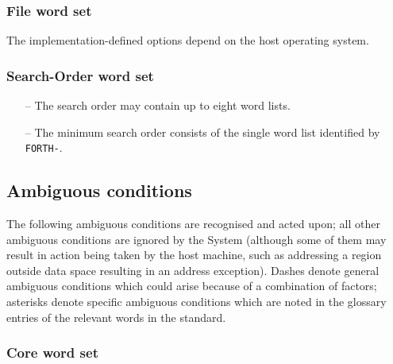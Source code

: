 \documentclass[english]{article}
\begin{document}
\subsubsection{File word set}

The implementation-defined options depend on the host operating system.

\subsubsection{Search-Order word set}

\begin{itemize}
\item[--]The search order may contain up to eight word lists.
\item[--]The minimum search order consists of the single word list identified
by {\tt FORTH-}.
\end{itemize}


\subsection{Ambiguous conditions}

The following ambiguous conditions are recognised and acted upon; all other
ambiguous conditions are ignored by the System (although some of them may
result in action being taken by the host machine, such as addressing a region
outside data space resulting in an address exception). Dashes denote general
ambiguous conditions which could arise because of a combination of factors;
asterisks denote specific ambiguous conditions which are noted in the
glossary entries of the relevant words in the standard.

\subsubsection{Core word set}
\end{document}
